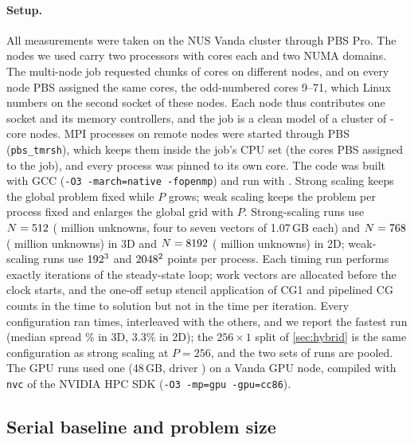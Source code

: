 \documentclass[10pt,a4paper]{article}
\newcommand{\code}[1]{\texttt{#1}}
\begin{document}
\paragraph{Setup.}
All measurements were taken on the NUS Vanda cluster through PBS Pro. The nodes we used carry two
\MachineCPU{} processors with \MachineCPS{} cores each and two NUMA domains. The multi-node job
requested \MachineNodes{} chunks of \MachineCPN{} cores on \MachineNodes{} different nodes, and on every node
PBS assigned the same \MachineCPN{} cores, the odd-numbered cores 9--71, which Linux numbers on the second
socket of these nodes. Each node thus contributes one socket and its memory controllers, and the job is a
clean model of a cluster of \MachineCPN-core nodes. MPI processes on remote
nodes were started through PBS (\code{pbs\_tmrsh}), which keeps them inside the job's CPU set (the cores PBS assigned to the job), and every
process was pinned to its own core. The code was built with GCC \MachineGCC{} (\code{-O3 -march=native
-fopenmp}) and run with \MachineMPI. Strong scaling keeps the global problem fixed while $P$ grows; weak scaling keeps the problem
per process fixed and enlarges the global grid with $P$. Strong-scaling runs use $N=512$ (\NSdofs{}
million unknowns, four to seven vectors of 1.07\,GB each) and $N=768$ (\NStwoDofs{} million
unknowns) in 3D and $N=8192$ (\TwoDofs{} million unknowns) in 2D; weak-scaling runs use
$192^3$ and $2048^2$ points per process. Each timing run performs exactly \Iters{} iterations of the steady-state
loop; work vectors are allocated before the clock starts, and the one-off setup stencil application of CG1
and pipelined CG counts in the time to solution but not in the time per iteration. Every configuration ran
\Reps{} times, interleaved with the others, and we report the fastest run (median spread
\MedSpread\% in 3D, 3.3\% in 2D); the $256\times1$ split of \cref{sec:hybrid} is the same configuration as strong scaling at
$P=256$, and the two sets of runs are pooled. The GPU runs used one \GpuName{} (48\,GB, driver \GpuDriver) on a Vanda GPU node,
compiled with \code{nvc} \GpuNVC{} of the NVIDIA HPC SDK (\code{-O3 -mp=gpu -gpu=cc86}).

\subsection{Serial baseline and problem size}\label{sec:serial}
\end{document}
